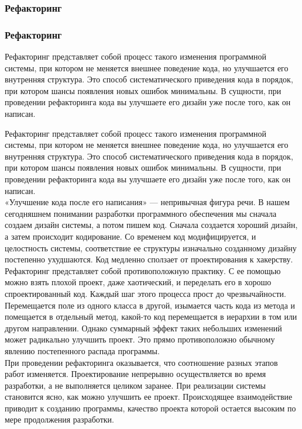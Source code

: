 \documentclass{../industrial-development}
\begin{document}
\subsubsection{Рефакторинг}
\begin{frame} \frametitle{Рефакторинг}
Рефакторинг представляет собой процесс такого изменения программной системы, при котором не меняется внешнее поведение кода, но улучшается его внутренняя структура. Это способ систематического приведения кода в порядок, при котором шансы появления новых ошибок минимальны. В сущности, при проведении рефакторинга кода вы улучшаете его дизайн уже после того, как он написан.
\end{frame}
\lecturenotes
Рефакторинг представляет собой процесс такого изменения программной системы, при котором не меняется внешнее поведение кода, но улучшается его внутренняя структура. Это способ систематического приведения кода в порядок, при котором шансы появления новых ошибок минимальны. В сущности, при проведении рефакторинга кода вы улучшаете его дизайн уже после того, как он написан.\\
«Улучшение кода после его написания» --- непривычная фигура речи. В нашем сегодняшнем понимании разработки программного обеспечения мы сначала создаем дизайн системы, а потом пишем код. Сначала создается хороший дизайн, а затем происходит кодирование. Со временем код модифицируется, и целостность системы, соответствие ее структуры изначально созданному дизайну постепенно ухудшаются. Код медленно сползает от проектирования к хакерству.\\
Рефакторинг представляет собой противоположную практику. С ее помощью можно взять плохой проект, даже хаотический, и переделать его в хорошо спроектированный код. Каждый шаг этого процесса прост до чрезвычайности. Перемещается поле из одного класса в другой, изымается часть кода из метода и помещается в отдельный метод, какой-то код перемещается в иерархии в том или другом направлении. Однако суммарный эффект таких небольших изменений может радикально улучшить проект. Это прямо противоположно обычному явлению постепенного распада программы.\\
При проведении рефакторинга оказывается, что соотношение разных этапов работ изменяется. Проектирование непрерывно осуществляется во время разработки, а не выполняется целиком заранее. При реализации системы становится ясно, как можно улучшить ее проект. Происходящее взаимодействие приводит к созданию программы, качество проекта которой остается высоким по мере продолжения разработки.
\end{document}
